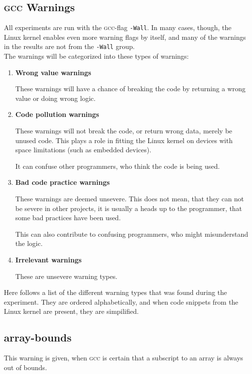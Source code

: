 \documentclass[a4paper,11pt]{report}
\newcommand{\textcode}[1]{\fboxsep=1pt\texttt{\colorbox{gray!20}{#1}}}
\begin{document}
            \subsection{\textsc{gcc} Warnings}
            \label{sec:gccwarns}
All experiments are run with the \textsc{gcc}-flag \textcode{-Wall}. In many 
cases, though, the Linux kernel enables even more warning flags by itself, and
many of the warnings in the results are not from the \texttt{-Wall} group.
\\

The warnings will be categorized into these types of warnings:

\begin{enumerate}
    \item \textbf{Wrong value warnings}

These warnings will have a chance of breaking the code by returning a wrong
value or doing wrong logic.

    \item \textbf{Code pollution warnings}

These warnings will not break the code, or return wrong data, merely be 
unused code. This plays a role in fitting the Linux kernel on devices with 
space limitations (such as embedded devices).

It can confuse other programmers, who think the code is being used.

    \item \textbf{Bad code practice warnings}

These warnings are deemed unsevere. This does not mean, that they can not be 
severe in other projects, it is usually a heads up to the programmer, that some 
bad practices have been used.

This can also contribute to confusing programmers, who might misunderstand the 
logic.


    \item \textbf{Irrelevant warnings}

These are unsevere warning types.

\end{enumerate}


Here follows a list of the different warning types that was found during the 
experiment.  They are ordered alphabetically, and when code snippets from the 
Linux kernel are present, they are simpilified.


            \subsection*{array-bounds}
This warning is given, when \textsc{gcc} is certain that a subscript to an array is always 
out of bounds.
\end{document}
